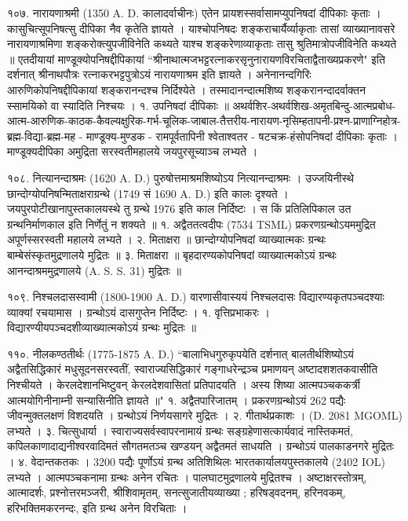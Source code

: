 १०७. नारायणाश्रमी (1350 A. D. कालादर्वाचीनः)
एतेन प्रायशस्सर्वासामप्युपनिषदां दीपिकाः कृताः । कासुचित्सूपनिषत्सु दीपिका नैव कृतेति ज्ञायते । याश्चोपनिषदः शङ्कराचार्यैर्व्याकृताः तासां व्याख्यानावसरे नारायणाश्रमिणा शङ्करोक्त्युपजीविनेति कथ्यते याश्च शङ्करेणाव्याकृताः तासु श्रुतिमात्रोपजीविनेति कथ्यते ॥ एतदीयायां माण्डूक्योपनिषद्दीपिकायां ``श्रीनाथात्मजभट्टरत्नाकरसृनुनारायणविरचिताद्वैताख्यप्रकरणे" इति दर्शनात् श्रीनाथपौत्रः रत्नाकरभट्टपुत्रोऽयं नारायणाश्रम इति ज्ञायते । अनेनानन्दगिरिः आरुणिकोपनिषद्दीपिकायां शङ्करानन्दश्च निर्दिश्येते । तस्मादानन्दात्मशिष्य शङ्करानन्दादर्वाक्तन स्सामयिको वा स्यादिति निश्चयः ।
१. उपनिषदां दीपिकाः ॥
अथर्वशिर-अथर्वशिख-अमृतबिन्दु-आत्मप्रबोध-आत्म-आरुणिक-काठक-कैवल्यक्षुरिक-गर्भ-चूलिक-जाबाल-तैत्तरीय-नारायण-नृसिम्हतापनी-प्रश्न-प्राणाग्निहोत्र-ब्रह्म-विद्या-ब्रह्म-मह - माण्डूक्य-मुण्डक - रामपूर्वतापिनी श्वेताश्वतर - षटचक्र-हंसोपनिषदां दीपिकाः कृताः । माण्डूक्यदीपिका अमुद्रिता सरस्वतीमहालये जयपुरसूच्याञ्च लभ्यते ।

१०८. नित्यानन्दाश्रमः (1620 A. D.)
पुरुषोत्तमाश्रमशिष्योऽय नित्यानन्दाश्रमः । उज्जयिनीस्थे छान्दोग्योपनिषन्मिताक्षराग्रन्थे (1749 सं 1690 A. D.) इति कालः दृश्यते । जयपुरपोटीखानापुस्तकालयस्थे तु ग्रन्थे 1976 इति काल निर्दिष्टः । स किं प्रतिलिपिकाल उत ग्रन्थनिर्माणकाल इति निर्णेतुं न शक्यते ॥
१. अद्वैततत्वदीपः (7534 TSML) प्रकरणग्रन्थोऽयममुद्रित अपूर्णस्सरस्वती महालये लभ्यते ।
२. मिताक्षरा ॥ छान्दोग्योपनिषदां व्याख्यात्मकः ग्रन्थः बाम्बेसंस्कृतमुद्रणालये मुद्रितः ॥
३. मिताक्षरा ॥ बृहदारण्यकोपनिषदां व्याख्यात्मकोऽयं ग्रन्थः आनन्दाश्रममुद्रणालये (A. S. S. 31) मुद्रितः ॥

१०९. निश्चलदासस्वामी (1800-1900 A. D.)
वारणासीवास्ययं निश्चलदासः विद्यारण्यकृतपञ्चदश्याः व्याक्यां रचयामास । ग्रन्थोऽयं दासगुप्तेन निर्दिष्टः ।
१. वृत्तिप्रभाकरः । विद्यारण्यीयपञ्चदशीव्याख्यात्मकोऽयं ग्रन्थः मुद्रितः ॥

११०. नीलकण्ठतीर्थः (1775-1875 A. D.)
``बालाभिधगुरुकृपयेति दर्शनात् बालतीर्थशिष्योऽयं अद्वैतसिद्धिकारं मधुसूदनसरस्वतीं, स्वाराज्यसिद्धिकारं गङ्गाधरेन्द्रञ्च प्रमाणयन् अष्टादशशतकवासीति निश्चीयते । केरलदेशानभिष्टुवन् केरलदेशवासितां प्रतिपादयति । अस्य शिष्या आत्मपञ्चककर्त्री आत्मयोगिनीनाम्नी सन्यासिनीति ज्ञायते ॥"
१. अद्वैतपारिजातम् । प्रकरणग्रन्थोऽयं 262 पद्यैः जीवन्मुक्तलक्षणं विशदयति । ग्रन्थोऽयं निर्णयसागरे मुद्रितः ।
२. गीतार्थप्रकाशः । (D. 2081 MGOML) लभ्यते । 
३. चित्सुधार्या । स्वाराज्यसर्वस्वापरनामायं ग्रन्थः सङ्ग्रहेणासत्कार्यवादं नास्तिकमतं, कपिलकाणादाद्यनीश्वरवादिमतं सौगतमतञ्च खण्डयन् अद्वैतमतं साधयति । ग्रन्थोऽयं पालकाडनगरे मुद्रितः ।
४. वेदान्तकतकः । 3200 पद्यैः पूर्णोऽयं ग्रन्थ अतिशिथिलः भारतकार्यालयपुस्तकालये (2402 IOL) लभ्यते । आत्मपञ्चकनामा ग्रन्थः अनेन रचितः । पालघाटमुद्रणालये मुद्रितश्च ।
अष्टाक्षरस्तोत्रम्, आत्मादर्शः, प्रश्नोत्तरमञ्जरी, श्रीशिवामृतम्, सनत्सुजातीयव्याख्या ; हरिषड्वदनम्,  हरिनवकम्, हरिभक्तिमकरनन्दः, इति ग्रन्थ अनेन विरचिताः ।

